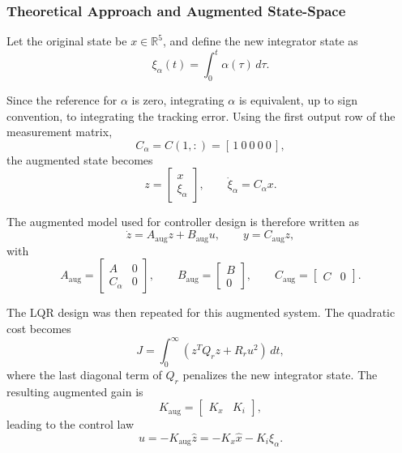 \subsubsection{Theoretical Approach and Augmented State-Space}

\par Let the original state be $x \in \mathbb{R}^5$, and define the new integrator state as
\begin{equation}
\xi_{\alpha}(t)=\int_0^t \alpha(\tau)\,d\tau .
\end{equation}

\par Since the reference for $\alpha$ is zero, integrating $\alpha$ is equivalent, up to 
sign convention, to integrating the tracking error. Using the first output row of the 
measurement matrix,
\[
C_{\alpha}=C(1,:)=[\,1\ 0\ 0\ 0\ 0\,],
\]
the augmented state becomes
\begin{equation}
z=
\begin{bmatrix}
x\\
\xi_{\alpha}
\end{bmatrix},
\qquad
\dot{\xi}_{\alpha}=C_{\alpha}x.
\end{equation}

\par The augmented model used for controller design is therefore written as
\begin{equation}
\dot{z}=A_{\mathrm{aug}}z+B_{\mathrm{aug}}u,
\qquad
y=C_{\mathrm{aug}}z,
\end{equation}
with
\begin{equation}
A_{\mathrm{aug}}=
\begin{bmatrix}
A & 0\\
C_{\alpha} & 0
\end{bmatrix},
\qquad
B_{\mathrm{aug}}=
\begin{bmatrix}
B\\
0
\end{bmatrix},
\qquad
C_{\mathrm{aug}}=
\begin{bmatrix}
C & 0
\end{bmatrix}.
\end{equation}

\par The LQR design was then repeated for this augmented system. The quadratic cost becomes
\begin{equation}
J=\int_0^{\infty}\left(z^{T}Q_{r}z+R_{r}u^{2}\right)\,dt,
\end{equation}
where the last diagonal term of $Q_r$ penalizes the new integrator state. The resulting 
augmented gain is
\begin{equation}
K_{\mathrm{aug}}=
\begin{bmatrix}
K_x & K_i
\end{bmatrix},
\end{equation}
leading to the control law
\begin{equation}
u=-K_{\mathrm{aug}}\hat{z}=-K_x\hat{x}-K_i\xi_{\alpha}.
\end{equation}

